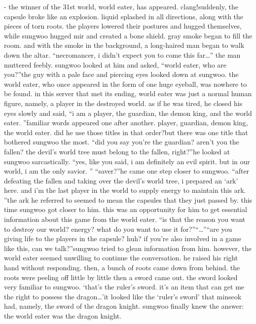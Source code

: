 - the winner of the 31st world, world eater, has appeared.
clang!suddenly, the capsule broke like an explosion.
 liquid splashed in all directions, along with the pieces of torn roots.
the players lowered their postures and hugged themselves, while sungwoo hugged mir and created a bone shield.
gray smoke began to fill the room.
 and with the smoke in the background, a long-haired man began to walk down the altar.
“necromancer, i didn’t expect you to come this far…” the man muttered feebly.
sungwoo looked at him and asked, “world eater, who are you?”the guy with a pale face and piercing eyes looked down at sungwoo.
the world eater, who once appeared in the form of one huge eyeball, was nowhere to be found.
 in this server that met its ending, world eater was just a normal human figure, namely, a player in the destroyed world.
as if he was tired, he closed his eyes slowly and said, “i am a player, the guardian, the demon king, and the world eater.
”familiar words appeared one after another.
 player, guardian, demon king, the world eater.
did he use those titles in that order?but there was one title that bothered sungwoo the most.
“did you say you’re the guardian? aren’t you the fallen? the devil’s world tree must belong to the fallen, right?”he looked at sungwoo sarcastically.
“yes, like you said, i am definitely an evil spirit.
 but in our world, i am the only savior.
”
“saver?”he came one step closer to sungwoo.
“after defeating the fallen and taking over the devil’s world tree, i prepared an ‘ark’ here.
 and i’m the last player in the world to supply energy to maintain this ark.
”the ark he referred to seemed to mean the capsules that they just passed by.
this time sungwoo got closer to him.
 this was an opportunity for him to get essential information about this game from the world eater.
“is that the reason you want to destroy our world? energy? what do you want to use it for?”“…”“are you giving life to the players in the capsule? huh? if you’re also involved in a game like this, can we talk?”sungwoo tried to glean information from him.
 however, the world eater seemed unwilling to continue the conversation.
 he raised his right hand without responding.
 then, a bunch of roots came down from behind.
the roots were peeling off little by little then a sword came out.
 the sword looked very familiar to sungwoo.
‘that’s the ruler’s sword.
 it’s an item that can get me the right to possess the dragon…’it looked like the ‘ruler’s sword’ that minseok had, namely, the sword of the dragon knight.
sungwoo finally knew the answer: the world eater was the dragon knight.
